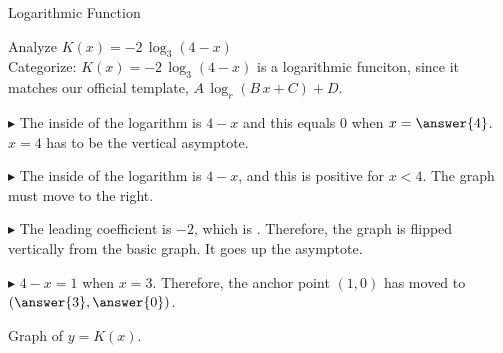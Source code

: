 \documentclass{ximera}
\begin{document}
\begin{example}  Logarithmic Function




Analyze   $K(x) = -2 \, \log_3(4-x)$ \\


Categorize: $K(x) = -2 \, \log_3(4-x)$ is a logarithmic funciton, since it matches our official template, $A \, \log_r(B \, x + C) + D$. \\




\begin{idea}

$\blacktriangleright$ The inside of the logarithm is $4-x$ and this equals $0$ when $x=\answer{4}$.  $x=4$ has to be the vertical asymptote.

$\blacktriangleright$ The inside of the logarithm is $4-x$, and this is positive for $x<4$.  The graph must move to the right.

$\blacktriangleright$ The leading coefficient is $-2$, which is  .  Therefore, the graph is flipped vertically from the basic graph. It goes up the asymptote. 

$\blacktriangleright$ $4-x=1$ when $x=3$. Therefore, the anchor point $(1,0)$ has moved to $\left( \answer{3}, \answer{0} \right)$.





Graph of $y = K(x)$.

\begin{image}
\end{image}
\end{idea}
\end{example}
\end{document}
